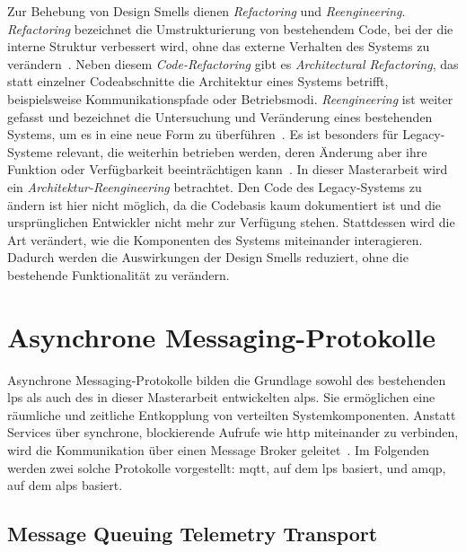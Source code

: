 \newpage

Zur Behebung von Design Smells dienen \textit{Refactoring} und \textit{Reengineering}. \textit{Refactoring} bezeichnet die Umstrukturierung von bestehendem Code, bei der die interne Struktur verbessert wird, ohne das externe Verhalten des Systems zu verändern~\citep{laguna_systematic_2013}. Neben diesem \textit{Code-Refactoring} gibt es \textit{Architectural Refactoring}, das statt einzelner Codeabschnitte die Architektur eines Systems betrifft, beispielsweise Kommunikationspfade oder Betriebsmodi. \textit{Reengineering} ist weiter gefasst und bezeichnet die Untersuchung und Veränderung eines bestehenden Systems, um es in eine neue Form zu überführen~\citep{laguna_systematic_2013}. Es ist besonders für Legacy-Systeme relevant, die weiterhin betrieben werden, deren Änderung aber ihre Funktion oder Verfügbarkeit beeinträchtigen kann~\citep{stevens_systems_1998}. In dieser Masterarbeit wird ein \textit{Architektur-Reengineering} betrachtet. Den Code des Legacy-Systems zu ändern ist hier nicht möglich, da die Codebasis kaum dokumentiert ist und die ursprünglichen Entwickler nicht mehr zur Verfügung stehen. Stattdessen wird die Art verändert, wie die Komponenten des Systems miteinander interagieren. Dadurch werden die Auswirkungen der Design Smells reduziert, ohne die bestehende Funktionalität zu verändern.

\section{Asynchrone Messaging-Protokolle}
\label{sec:grundlagen-messaging-protocolls}

Asynchrone Messaging-Protokolle bilden die Grundlage sowohl des bestehenden \gls{lps} als auch des in dieser Masterarbeit entwickelten \gls{alps}. Sie ermögli\-chen eine räumliche und zeitliche Entkopplung von verteilten Systemkomponenten. Anstatt Services über synchrone, blockierende Aufrufe wie \gls{http} miteinander zu verbinden, wird die Kommunikation über einen Message Broker geleitet~\citep{hohpe2004enterprise}. Im Folgenden werden zwei solche Protokolle vorgestellt: \gls{mqtt}, auf dem \gls{lps} basiert, und \gls{amqp}, auf dem \gls{alps} basiert.

\subsection{Message Queuing Telemetry Transport}
\label{sub:grundlagen-mqtt}

